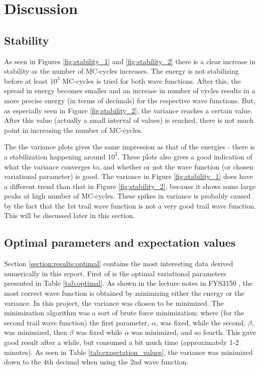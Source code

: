 \documentclass[12pt,english,a4paper]{article}
\begin{document}
\section{Discussion} \label{section:discussion}
\subsection{Stability} \label{section:discussion:stability}
As seen in Figures \ref{fig:stability_1} and \ref{fig:stability_2} there is a clear increase in stability as the number of MC-cycles increases. The energy is not stabilizing before at least $10^3$ MC-cycles is tried for both wave functions. After this, the spread in energy becomes smaller and an increase in number of cycles results in a more precise energy (in terms of decimals) for the respective wave functions. But, as especially seen in Figure \ref{fig:stability_2}, the variance reaches a certain value. After this value (actually a small interval of values) is reached, there is not much point in increasing the number of MC-cycles.

The the variance plots gives the same impression as that of the energies - there is a stabilization happening around $10^3$. These plots also gives a good indication of what the variance converges to, and whether or not the wave function (or chosen variational parameter) is good. The variance in Figure \ref{fig:stability_1} does have a different trend than that in Figure \ref{fig:stability_2}, because it shows some large peaks at high number of MC-cycles. These spikes in variance is probably caused by the fact that the 1st trail wave function is not a very good trail wave function. This will be discussed later in this section.

\subsection{Optimal parameters and expectation values} \label{section:discussion:optimal}
Section \ref{section:results:optimal} contains the most interesting data derived numerically in this report. First of is the optimal variational parameters presented in Table \ref{tab:optimal}. As shown in the lecture notes in FYS3150 \cite{Lec15}, the most correct wave function is obtained by minimizing either the energy or the variance. In this project, the variance was chosen to be minimized. The minimization algorithm was a sort of brute force minimization; where (for the second trail wave function) the first parameter, $\alpha$, was fixed, while the second, $\beta$, was minimized, then $\beta$ was fixed while $\alpha$ was minimized, and so fourth. This gave good result after a while, but consumed a bit much time (approximately 1-2 minutes). As seen in Table \ref{tab:expectation_values}, the variance was minimized down to the 4th decimal when using the 2nd wave function.
\end{document}
